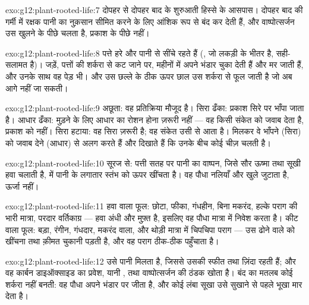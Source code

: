 \begin{solution}{exo:g12:plant-rooted-life:7}
दोपहर से दोपहर बाद के शुरुआती हिस्से के आसपास। दोपहर बाद की गर्मी में रक्षक
 पानी का नुक़सान सीमित करने के लिए  आंशिक रूप से बंद कर देती
हैं, और वाष्पोत्सर्जन उस खुलने के पीछे चलता है, प्रकाश के पीछे नहीं।
\end{solution}

\begin{solution}{exo:g12:plant-rooted-life:8}
पत्ते हरे और पानी से सींचे रहते हैं (, जो लकड़ी के भीतर है, सही-सलामत
है)। जड़ें, पत्तों की शर्करा से कट जाने पर, महीनों में अपने भंडार चुका देती
हैं और मर जाती हैं, और उनके साथ वह पेड़ भी। और उस छल्ले के ठीक ऊपर छाल उस
शर्करा से फूल जाती है जो अब आगे नहीं जा सकती।
\end{solution}

\begin{solution}{exo:g12:plant-rooted-life:9}
अछूता: वह प्रतिक्रिया मौजूद है। सिरा ढँका: प्रकाश सिरे पर भाँपा जाता है।
आधार ढँका: मुड़ने के लिए आधार का रोशन होना ज़रूरी नहीं --- वह किसी संकेत को
जवाब देता है, प्रकाश को नहीं। सिरा हटाया: वह सिरा ज़रूरी है; वह संकेत उसी से
आता है। मिलकर वे भाँपने (सिरा) को जवाब देने (आधार) से अलग करते हैं और
दिखाते हैं कि उनके बीच कोई चीज़ चलती है।
\end{solution}

\begin{solution}{exo:g12:plant-rooted-life:10}
सूरज से: पत्ती सतह पर पानी का वाष्पन, जिसे सौर ऊष्मा तथा सूखी हवा चलाती है,
 में पानी के लगातार स्तंभ को ऊपर खींचता है। वह पौधा नलियाँ और खुले
 जुटाता है, ऊर्जा नहीं।
\end{solution}

\begin{solution}{exo:g12:plant-rooted-life:11}
हवा वाला फूल: छोटा, फीका, गंधहीन, बिना मकरंद, हल्के पराग की भारी मात्रा,
परदार वर्तिकाग्र --- हवा अंधी और मुफ़्त है, इसलिए वह पौधा मात्रा में निवेश
करता है। कीट वाला फूल: बड़ा, रंगीन, गंधदार, मकरंद वाला, और थोड़ी मात्रा में
चिपचिपा पराग --- उस ढोने वाले को खींचना तथा क़ीमत चुकानी पड़ती है, और वह
पराग ठीक-ठीक पहुँचाता है।
\end{solution}

\begin{solution}{exo:g12:plant-rooted-life:12}
उसे पानी मिलता है, जिससे उसकी  स्फीत तथा ज़िंदा रहती हैं; और वह
कार्बन डाइऑक्साइड का प्रवेश, यानी , तथा वाष्पोत्सर्जन की
ठंडक खोता है। बंद  का मतलब कोई शर्करा नहीं बनती: वह पौधा अपने भंडार
पर जीता है, और कोई लंबा सूखा उसे सुखाने से पहले भूखा मार देता है।
\end{solution}


